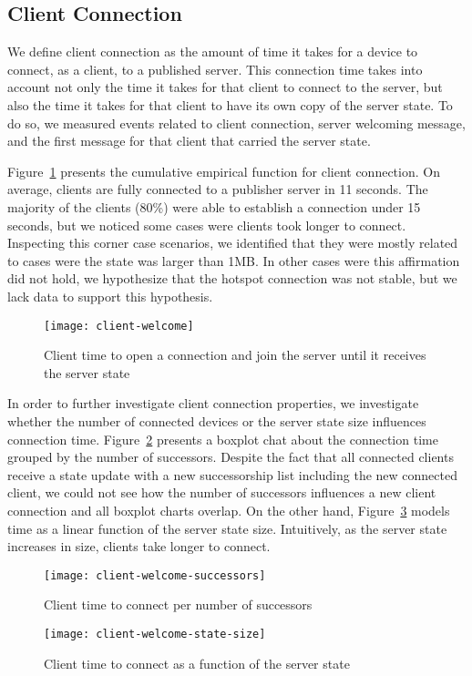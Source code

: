 \subsection{Client Connection}
\label{sub:eval:connection}


We define client connection as the amount of time it takes for a device to connect, as a client, to a published server.
This connection time takes into account not only the time it takes for that client to connect to the server, 
but also the time it takes for that client to have its own copy of the server state. 
To do so, we measured events related to client connection, server welcoming message, and the first message for that client that carried the server state.


Figure~\ref{fig:client-welcome} presents the cumulative empirical function for client connection.
On average, clients are fully connected to a publisher server in 11 seconds. 
The majority of the clients (80\%) were able to establish a connection under 15 seconds, 
but we noticed some cases were clients took longer to connect. 
Inspecting this corner case scenarios, we identified that they were mostly related to cases were the state was larger than 1MB.
In other cases were this affirmation did not hold, we hypothesize that the hotspot connection was not stable, but we lack data to support this hypothesis.


\begin{figure}
    \centering
    \texttt{[image: client-welcome]}
    \caption{Client time to open a connection and join the server until it receives the server state}
    \label{fig:client-welcome}
\end{figure}


In order to further investigate client connection properties, we investigate whether the number of connected devices or the server state size influences connection time.
Figure~\ref{fig:client-welcome-successors} presents a boxplot chat about the connection time grouped by the number of successors.
Despite the fact that all connected clients receive a state update with a new successorship list including the new connected client, 
we could not see how the number of successors influences a new client connection and all boxplot charts overlap.
On the other hand, Figure~\ref{fig:client-welcome-state-size} models time as a linear function of the server state size.
Intuitively, as the server state increases in size, clients take longer to connect. 


\begin{figure}
    \centering
    \texttt{[image: client-welcome-successors]}
    \caption{Client time to connect per number of successors}
    \label{fig:client-welcome-successors}
\end{figure}

\begin{figure}
    \centering
    \texttt{[image: client-welcome-state-size]}
    \caption{Client time to connect as a function of the server state}
    \label{fig:client-welcome-state-size}
\end{figure}